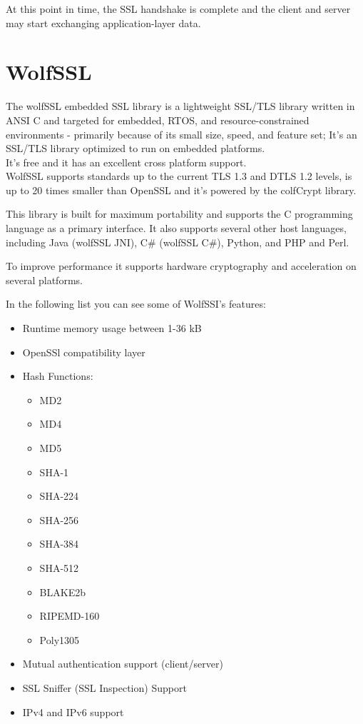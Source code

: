 \documentclass[a4paper,12pt]{report}
\begin{document}
\begin{itemize}
\begin{enumerate}
\end{enumerate}
\end{itemize}

At this point in time, the SSL handshake is complete and the client and server may start exchanging application-layer data.

\chapter{WolfSSL}
The wolfSSL embedded SSL library is a lightweight SSL/TLS library written in ANSI C and targeted for embedded, RTOS, and resource-constrained
environments - primarily because of its small size, speed, and feature set; It's an SSL/TLS library optimized to run on embedded platforms.
\\It's free and it has an excellent cross platform support.
\\WolfSSL supports standards up to the current TLS 1.3 and DTLS 1.2 levels, is up to
20 times smaller than OpenSSL and it's powered by the colfCrypt library.

\vspace{5mm} %
This library is built for maximum portability and supports the C programming language as a primary interface. It also supports several other host languages, including Java (wolfSSL JNI), C\# (wolfSSL C\#), Python, and PHP and Perl.

\vspace{5mm} %
To improve performance it supports hardware cryptography and acceleration on several platforms.

\vspace{5mm} %
In the following list you can see some of WolfSSI’s features:
\begin{itemize}
\item Runtime memory usage between 1-36 kB
\item OpenSSl compatibility layer
\item Hash Functions: \begin{multicols}{3}\begin{itemize}
\item MD2
\item MD4
\item MD5
\item SHA-1
\item SHA-224
\item SHA-256
\item SHA-384
\item SHA-512
\item BLAKE2b
\item RIPEMD-160
\item Poly1305
\end{itemize}
\end{multicols}
\item Mutual authentication support (client/server)
\item SSL Sniffer (SSL Inspection) Support
\item IPv4 and IPv6 support


\end{itemize}
\end{document}
